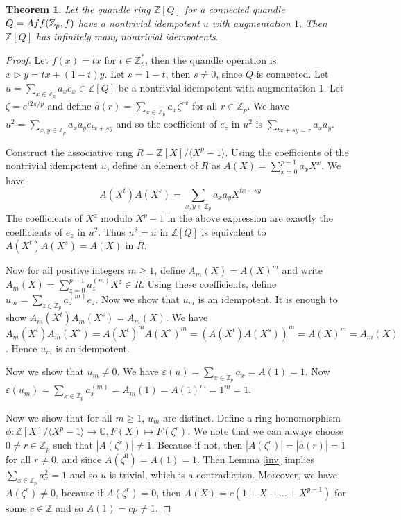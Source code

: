\documentclass[10pt,a4paper]{amsart}
\newtheorem{theorem}{Theorem}
\begin{document}
\begin{theorem}
Let the quandle ring $\mathbb Z[Q]$ for a connected quandle $Q={\rm Aff}(\mathbb Z_p,f)$ have a nontrivial idempotent $u$ with augmentation $1$. Then $\mathbb Z[Q]$ has infinitely many nontrivial idempotents.
\end{theorem}

\begin{proof}
Let $f(x)=tx$ for $t\in \mathbb Z_{p}^{*}$, then the quandle operation is $x\triangleright y=tx+(1-t)y$. Let $s=1-t$, then $s\neq 0$, since $Q$ is connected.  Let $u = \sum\limits_{x\in \mathbb Z_p}a_xe_x\in \mathbb Z[Q]$ be a nontrivial idempotent with augmentation $1$. Let $\zeta=e^{i2\pi/p}$ and define $\hat{a}(r)=\sum\limits_{x\in \mathbb Z_p}a_x\zeta^{rx}$ for all $r\in \mathbb Z_{p}$. We have $u^2=\sum\limits_{x,y\in \mathbb Z_p}a_xa_ye_{tx+sy}$ and so the coefficient of $e_z$ in $u^2$ is $\sum\limits_{tx+sy=z}a_xa_y$.



Construct the associative ring $R=\mathbb Z[X]/\langle X^{p}-1 \rangle$. Using the coefficients of the nontrivial idempotent $u$, define an element of $R$ as $A(X)=\sum\limits_{x=0}^{p-1}a_xX^x$. We have 
\[ A(X^{t})A(X^{s})= \sum\limits_{x,y\in \mathbb Z_p}a_xa_yX^{tx+sy}\]
The coefficients of $X^z$ modulo $X^{p}-1$ in the above expression
are exactly the coefficients of $e_z$ in $u^2$. Thus $u^2=u$ in $\mathbb Z[Q]$ is equivalent to $A(X^{t})A(X^{s})=A(X)$ in $R$.

Now for all positive integers $m\geq 1$, define $A_m(X)=A(X)^m$ and write $A_m(X)=\sum\limits_{z=0}^{p-1}a_z^{(m)}X^z \in R$. Using these coefficients, define $u_m=\sum\limits_{z \in \mathbb Z_p}a_z^{(m)}e_z$. Now we show that $u_m$ is an idempotent. It is enough to show $A_m(X^{t})A_{m}(X^{s})=A_m(X)$. We have
$A_m(X^{t})A_m(X^{s})=A(X^{t})^mA(X^{s})^m=(A(X^{t})A(X^{s}))^m=A(X)^m=A_m(X)$. Hence $u_m$ is an idempotent.

Now we show that $u_m\neq 0$. We have $\varepsilon(u)=\sum\limits_{x\in \mathbb Z_p}a_x=A(1)=1$. Now $\varepsilon(u_m)=\sum\limits_{x\in \mathbb Z_p}a_x^{(m)}=A_m(1)=A(1)^m=1^m=1$.

Now we show that for all $m\geq 1$, $u_m$ are distinct. Define a ring homomorphism $\phi: \mathbb Z[X]/\langle X^{p}-1 \rangle \rightarrow \mathbb C, F(X)\mapsto F(\zeta^r)$. We note that we can always choose $0\neq r\in \mathbb Z_{p}$ such that $|A(\zeta^r)|\neq 1$. Because if not, then $|A(\zeta^r)|=|\hat{a}(r)|=1$ for all $r\neq 0$, and since $A(\zeta^0)=A(1)=1$. Then Lemma \ref{inv} implies $\sum\limits_{x\in \mathbb Z_p}a_x^2=1$ and so $u$ is trivial, which is a contradiction. 
Moreover, we have $A(\zeta^r)\neq 0$, because if $A(\zeta^r)=0$, then $A(X)=c(1+X+\dots+X^{p-1})$ for some $c\in \mathbb Z$ and so $A(1)=cp\neq 1$.



\end{proof}
\end{document}
